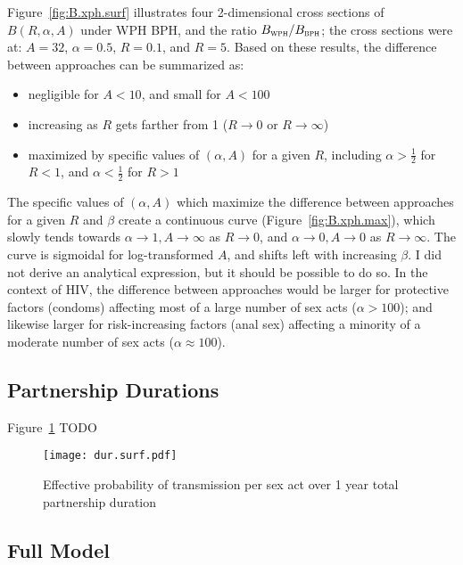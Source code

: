 Figure~\ref{fig:B.xph.surf} illustrates four 2-dimensional cross sections of $B(R,\alpha,A)$
under WPH \vs BPH, and the ratio $B_{\textsc{wph}} / B_{\textsc{bph}}$;
the cross sections were at: $A = 32$, $\alpha = 0.5$, $R = 0.1$, and $R = 5$.
Based on these results, the difference between approaches can be summarized as:
\begin{itemize}
  \item negligible for $A < 10$, and small for $A < 100$
  \item increasing as $R$ gets farther from 1 ($R \rightarrow 0$ or $R \rightarrow \infty$)
  \item maximized by specific values of $(\alpha,A)$ for a given $R$, including
    $\alpha > \frac12$ for $R < 1$, and $\alpha < \frac12$ for $R > 1$
\end{itemize}
The specific values of $(\alpha,A)$ which maximize
the difference between approaches for a given $R$ and $\beta$
create a continuous curve (Figure~\ref{fig:B.xph.max}), which slowly tends towards
$\alpha \rightarrow 1, A \rightarrow \infty$ as $R \rightarrow 0$, and
$\alpha \rightarrow 0, A \rightarrow 0$ as $R \rightarrow \infty$.
The curve is sigmoidal for log-transformed $A$,
and shifts left with increasing $\beta$.
I did not derive an analytical expression, but it should be possible to do so.
In the context of HIV, the difference between approaches would be
larger for protective factors (\eg condoms)
affecting most of a large number of sex acts ($\alpha > 100$);
and likewise larger for risk-increasing factors (\eg anal sex)
affecting a minority of a moderate number of sex acts ($\alpha \approx 100$).
\subsection{Partnership Durations}\label{foi.exp.dur}
Figure~\ref{fig:dur.surf} TODO
\begin{figure}
  \centering\texttt{[image: dur.surf.pdf]}
  \caption{Effective probability of transmission per sex act
    over 1 year \vs total partnership duration}
  \label{fig:dur.surf}
\end{figure}
\subsection{Full Model}\label{foi.exp.model}
